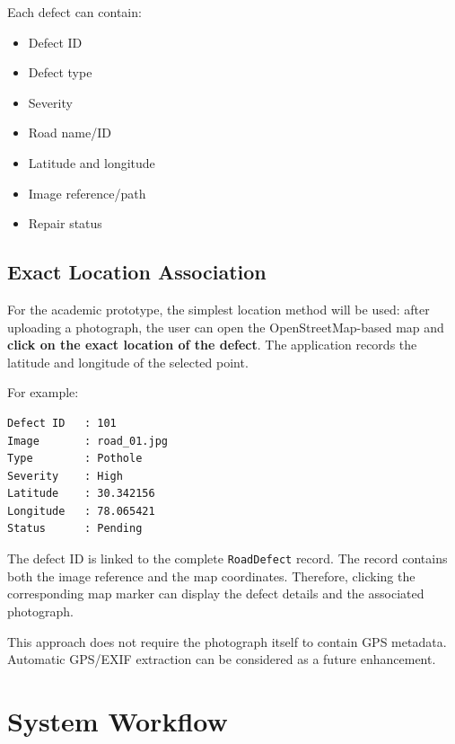 \documentclass[12pt,a4paper]{article}
\begin{document}
Each defect can contain:
\begin{itemize}[leftmargin=*]
    \item Defect ID
    \item Defect type
    \item Severity
    \item Road name/ID
    \item Latitude and longitude
    \item Image reference/path
    \item Repair status
\end{itemize}

\subsection{Exact Location Association}

For the academic prototype, the simplest location method will be used: after uploading a photograph, the user can open the OpenStreetMap-based map and \textbf{click on the exact location of the defect}. The application records the latitude and longitude of the selected point.

For example:

\begin{verbatim}
Defect ID   : 101
Image       : road_01.jpg
Type        : Pothole
Severity    : High
Latitude    : 30.342156
Longitude   : 78.065421
Status      : Pending
\end{verbatim}

The defect ID is linked to the complete \texttt{RoadDefect} record. The record contains both the image reference and the map coordinates. Therefore, clicking the corresponding map marker can display the defect details and the associated photograph.

This approach does not require the photograph itself to contain GPS metadata. Automatic GPS/EXIF extraction can be considered as a future enhancement.

\section{System Workflow}
\end{document}
